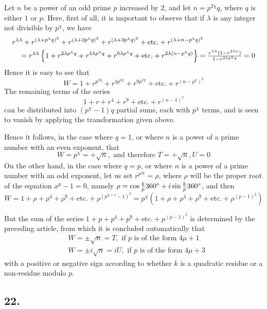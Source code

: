 \documentclass[twoside,12pt]{memoir}
\let\oldfrac\frac
\def\frac#1#2{\mathchoice{\tfrac{#1}{#2}}{\oldfrac{#1}{#2}}{\genfrac{}{}{}{2}{#1}{#2\mathstrut}}{\genfrac{}{}{}{3}{#1}{#2\mathstrut}}}
\begin{document}
Let \(n\) be a power of an odd prime \(p\) increased by 2, and let \(n = p^{2 \chi} q\), where \(q\) is either \(1\) or \(p\). Here, first of all, it is important to observe that if \(\lambda\) is any integer not divisible by \(p^{\chi}\), we have\pagebreak%
\[\begin{aligned}
& r^{\lambda \lambda}+r^{(\lambda+p^{\chi} q)^{2}}+r^{(\lambda+2 p^{\chi} q)^{2}}+r^{(\lambda+3 p^{\chi} q)^{2}}+\text{etc{.}}+r^{(\lambda+n-p^{\chi} q)^{2}} \\
& \quad=r^{\lambda \lambda}\left\{1+r^{2 \lambda p^{\chi} q}+r^{4 \lambda p^{\chi} q}+r^{6 \lambda p^{\chi} q}+\text{etc{.}}+r^{2 \lambda(n-p^{\chi} q)}\right\}=\frac{r^{\lambda \lambda}(1-r^{2 \lambda n})}{1-r^{2 \lambda p^{\chi} q}}=0
\end{aligned}\]
Hence it is easy to see that
\[W=1+r^{p^{2 \chi}}+r^{4 p^{2 \chi}}+r^{9 p^{2 \chi}}+\text{etc{.}}+r^{(n-p^{\chi})^{2}}\]
The remaining terms of the series
\[1+r+r^{4}+r^{9}+\text{etc{.}}+r^{(n-1)^{2}}\]
can be distributed into \((p^{\chi}-1) q\) partial sums, each with \(p^{\chi}\) terms, and is seen to vanish by applying the transformation given above.

Hence it follows, in the case where \(q=1\), or where \(n\) is a power of a prime number with an even exponent, that
\[W=p^{\chi}=+\sqrt{n}, \text{ and therefore } T=+\sqrt{n}, U=0\]
On the other hand, in the case where \(q=p\), or where \(n\) is a power of a prime number with an odd exponent, let us set \(r^{p^{2\chi}}=\rho\), where \(\rho\) will be the proper root of the equation \(x^{p}-1=0\), namely \(\rho=\cos \frac{k}{p} 360^{\circ}+i \sin \frac{k}{p} 360^{\circ}\), and then
\[W=1+\rho+\rho^{4}+\rho^{9}+\text{etc{.}}+\rho^{(p^{\chi+1}-1)^{2}}=p^{\chi}(1+\rho+\rho^{4}+\rho^{9}+\text{etc{.}}+\rho^{(p-1)^{2}})\]

But the sum of the series \(1+p+p^{4}+p^{9}+\text{etc.}+p^{(p-1)^{2}}\) is determined by the preceding article, from which it is concluded automatically that
\[\begin{aligned}
& W= \pm \sqrt{n}=T, \text{ if } p \text{ is of the form } 4 \mu+1 \\
& W= \pm i \sqrt{n}=i U, \text{ if } p \text{ is of the form } 4 \mu+3
\end{aligned}\]
with a positive or negative sign according to whether \(k\) is a quadratic residue or a non-residue modulo \(p\).

\subsection*{22.}
\end{document}
